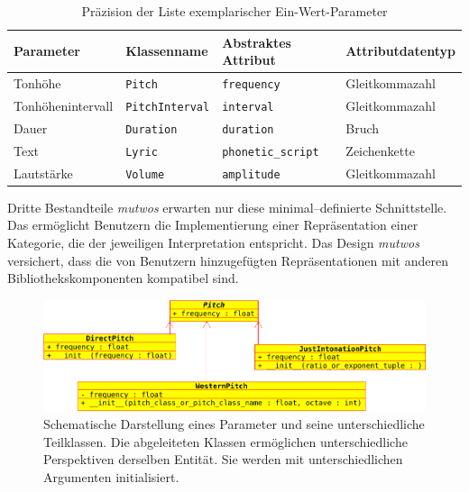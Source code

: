 \documentclass[12pt,a4paper,ngerman]{article}
\begin{document}
\begin{table}[H]
    \begin{center}
        \begin{tabular}{l l l l} 
            \hline
            Parameter & Klassenname & Abstraktes Attribut & Attributdatentyp \\ [0.5ex] 
            \hline\hline
            Tonhöhe & \texttt{Pitch} & \texttt{frequency} & Gleitkommazahl \\ 
            Tonhöhenintervall & \texttt{PitchInterval} & \texttt{interval} & Gleitkommazahl \\ 
            Dauer & \texttt{Duration} & \texttt{duration} & Bruch \\ 
            Text & \texttt{Lyric} & \texttt{phonetic\_script} & Zeichenkette \\ 
            Lautstärke & \texttt{Volume} & \texttt{amplitude} & Gleitkommazahl \\ [1ex] 
            \hline
        \end{tabular}
    \end{center}

    \caption{Präzision der Liste exemplarischer Ein-Wert-Parameter}
\end{table}

Dritte Bestandteile \emph{mutwos} erwarten nur diese minimal--definierte Schnittstelle.
Das ermöglicht Benutzern die Implementierung einer Repräsentation einer Kategorie, die der jeweiligen Interpretation entspricht.
Das Design \emph{mutwos} versichert, dass die von Benutzern hinzugefügten Repräsentationen mit anderen Bibliothekskomponenten kompatibel sind.

\begin{figure}[h!]
    \includegraphics[scale=0.4]{uml_diagrams/pitches.png}

    \caption{%
        Schematische Darstellung eines Parameter und seine unterschiedliche Teilklassen.
        Die abgeleiteten Klassen ermöglichen unterschiedliche Perspektiven derselben Entität.
        Sie werden mit unterschiedlichen Argumenten initialisiert.
    }

\end{figure}
\end{document}
